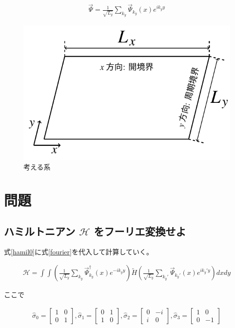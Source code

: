 \documentclass{jsarticle}
\begin{document}
		\begin{align}
			\vec{\Psi}=\frac{1}{\sqrt{L_y}}\sum_{k_y} \vec{\Psi}_{k_y}(x) e^{ik_yy}
			\label{fourier}
		\end{align}

		\begin{figure}[H]
			\centering
			\includegraphics[scale=1]{figure1}
			\caption{考える系}
			\label{system}
		\end{figure}

	\section{問題}
		\subsection{ハミルトニアン $\mathcal{H}$ をフーリエ変換せよ}
		式\eqref{hamil0}に式\eqref{fourier}を代入して計算していく。
		
		\begin{align}
			\mathcal{H}=\int \int \left( \frac{1}{\sqrt{L_y}}\sum_{k_y} \vec{\Psi}^\dagger _{k_y}(x) e^{-ik_yy} \right) \tilde{H} \left( \frac{1}{\sqrt{L_y}}\sum_{k_y'} \vec{\Psi}_{k_y'}(x) e^{ik_y'y} \right) dxdy
			\label{hamil1}
		\end{align}
		
		ここで
		
		\begin{align}
			\hat{\sigma}_0=
			\begin{bmatrix}
				1 & 0 \\ 
				0 & 1
			\end{bmatrix},
			\hat{\sigma}_1=
			\begin{bmatrix}
				0 & 1 \\ 
				1 & 0
			\end{bmatrix},
			\hat{\sigma}_2=
			\begin{bmatrix}
				0 & -i \\ 
				i & 0
			\end{bmatrix} ,
			\hat{\sigma}_3=
			\begin{bmatrix}
				1 & 0 \\ 
				0 & -1
			\end{bmatrix}  
		\end{align}
		
\end{document}
